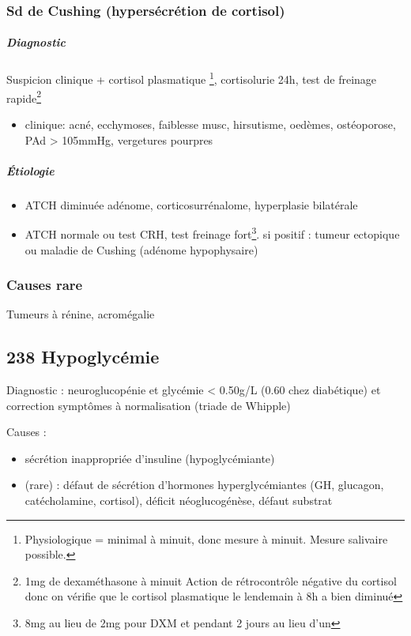 \documentclass[11pt]{article}
\begin{document}
\subsubsection{Sd de Cushing (hypersécrétion de cortisol)}
\label{sec:org8ed645a}

\subparagraph{Diagnostic}
\label{sec:orgc7c3f18}
Suspicion clinique + cortisol plasmatique \footnote{Physiologique = minimal à minuit, donc mesure à minuit. Mesure salivaire possible.}, cortisolurie 24h, test de freinage rapide\footnote{1mg de dexaméthasone à minuit Action de rétrocontrôle négative du
cortisol donc on vérifie que le cortisol plasmatique le lendemain à 8h a bien diminué}
\begin{itemize}
\item clinique: acné, ecchymoses, faiblesse musc, hirsutisme, oedèmes, ostéoporose, PAd
> 105mmHg, vergetures pourpres
\end{itemize}

\subparagraph{Étiologie}
\label{sec:org52da8ce}
\begin{itemize}
\item ATCH diminuée \thus adénome, corticosurrénalome, hyperplasie bilatérale
\item ATCH normale ou \inc \thus test CRH, test freinage fort\footnote{8mg au lieu de 2mg pour DXM et pendant 2 jours au lieu d'un}. si positif : tumeur ectopique ou
maladie de Cushing  (adénome hypophysaire)
\end{itemize}

\subsubsection{Causes rare}
\label{sec:orgef1ef6e}
Tumeurs à rénine, acromégalie
\subsection{238 \textdagger{} Hypoglycémie}
\label{sec:org3de4335}
Diagnostic : neuroglucopénie et glycémie < 0.50g/L (0.60 chez diabétique) et correction symptômes
à normalisation (triade de Whipple)

Causes :
\begin{itemize}
\item sécrétion inappropriée d'insuline (hypoglycémiante)
\item (rare) : défaut de sécrétion d'hormones hyperglycémiantes (GH, glucagon,
catécholamine, cortisol), déficit néoglucogénèse, défaut substrat
\end{itemize}
\end{document}
